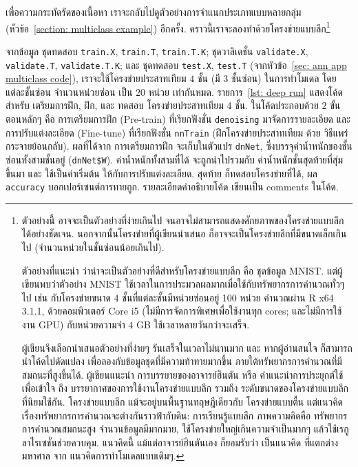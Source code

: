 เพื่อความกระทัดรัดของเนื้อหา เราจะกลับไปดูตัวอย่างการจำแนกประเภทแบบหลายกลุ่ม (หัวข้อ~\ref{section: multiclass example}) อีกครั้ง.
คราวนี้เราจะลองทำด้วยโครงข่ายแบบลึก\footnote{
ตัวอย่างนี้ อาจจะเป็นตัวอย่างที่ง่ายเกินไป จนอาจไม่สามารถแสดงศักยภาพของโครงข่ายแบบลึก
ได้อย่างชัดเจน.
นอกจากนั้นโครงข่ายที่ผู้เขียนนำเสนอ ก็อาจจะเป็นโครงข่ายลึกที่มีขนาดเล็กเกินไป (จำนวนหน่วยในชั้นซ่อนน้อยเกินไป).

ตัวอย่างที่แนะนำ ว่าน่าจะเป็นตัวอย่างที่ดีสำหรับโครงข่ายแบบลึก คือ ชุดข้อมูล MNIST\cite{MNIST20150311}.
แต่ผู้เขียนพบว่าตัวอย่าง MNIST ใช้เวลาในการประมวลผลมากเมื่อใช้กับทรัพยากรการคำนวณทั่วๆไป เช่น กับโครงข่ายขนาด 4 ชั้นที่แต่ละชั้นมีหน่วยซ่อนอยู่ 100 หน่วย คำนวณผ่าน R x64 3.1.1, ด้วยคอมพิวเตอร์ Core i5 (ไม่มีการจัดการพิเศษเพื่อใช้งานทุก cores; และไม่มีการใช้งาน GPU) กับหน่วยความจำ $4$ GB ใช้เวลาหลายวันกว่าจะเสร็จ.

ผู้เขียนจึงเลือกนำเสนอตัวอย่างที่ง่ายๆ รันเสร็จในเวลาไม่นานมาก และ หากผู้อ่านสนใจ ก็สามารถนำโค้ดไปดัดแปลง เพื่อลองกับข้อมูลชุดที่มีความท้าทายมากขึ้น ภายใต้ทรัพยากรการคำนวณที่มีสมถนะที่สูงขึ้นได้.
ผู้เขียนแนะนำ การบรรยายของอาจารย์ฮินตัน\cite{HintonBrainSexML} หรือ คำแนะนำการประยุกต์ใช้\cite{HintonRecipe} เพื่อเข้าใจ ถึง บรรยากาศของการใช้งานโครงข่ายแบบลึก รวมถึง ระดับขนาดของโครงข่ายแบบลึก ที่นิยมใช้กัน.
โครงข่ายแบบลึก แม้จะอยู่บนพื้นฐานทฤษฎีเดียวกับ โครงข่ายแบบตื้น แต่แนวคิดเรื่องทรัพยากรการคำนวณจะต่างกันราวฟ้ากับดิน:
การเรียนรู้แบบลึก ภาพความคิดคือ ทรัพยากรการคำนวณสมถนะสูง จำนวนข้อมูลมีมากมาย,
ใช้โครงข่ายใหญ่เกินความจำเป็นมากๆ แล้วใช้เรกูลาไรเซชั่นช่วยควบคุม.
แนวคิดนี้ แม้แต่อาจารย์ฮินตันเอง\cite{HintonBrainSexML} ก็ยอมรับว่า เป็นแนวคิด ที่แตกต่างมหาศาล จาก แนวคิดการทำโมเดลแบบเดิมๆ.
}

จากข้อมูล ชุดทดสอบ \verb|train.X|, \verb|train.T|, \verb|train.T.K|;
ชุดวาลิเดชั่น \verb|validate.X|, \verb|validate.T|, \verb|validate.T.K|;
และ ชุดทดสอบ \verb|test.X|, \verb|test.T| (จากหัวข้อ~\ref{sec: ann app multiclass code}), เราจะใช้โครงข่ายประสาทเทียม $4$ ชั้น (มี $3$ ชั้นซ่อน) ในการทำโมเดล โดย แต่ละชั้นซ่อน จำนวนหน่วยซ่อน เป็น $20$ หน่วย เท่ากันหมด.
รายการ~\ref{lst: deep run} แสดงโค้ดสำหรับ  เตรียมการฝึก, ฝึก, และ ทดสอบ โครงข่ายประสาทเทียม 4 ชั้น.
ในโค้ดประกอบด้วย $2$ ขั้นตอนหลักๆ คือ การเตรียมการฝึก (Pre-train) ที่เรียกฟังชั่น \verb|denoising| มาจัดการรายละเอียด
และ การปรับแต่งละเอียด (Fine-tune) ที่เรียกฟังชั่น \verb|nnTrain| (ฝึกโครงข่ายประสาทเทียม ด้วย วิธีแพร่กระจายย้อนกลับ).
ผลที่ได้จาก การเตรียมการฝึก จะเก็บในตัวแปร \verb|dnNet|, ซึ่งบรรจุค่าน้ำหนักของชั้นซ่อนทั้งสามชั้นอยู่ (\verb|dnNet$W|).
ค่าน้ำหนักทั้งสามที่ได้ จะถูกนำไปรวมกับ ค่าน้ำหนักชั้นสุดท้ายที่สุ่มขึ้นมา และ ใช้เป็นค่าเริ่มต้น ให้กับการปรับแต่งละเอียด.
สุดท้าย ก็ทดสอบโครงข่ายที่ได้, ผล \verb|accuracy| บอกเปอร์เซนต์การทายถูก.
รายละเอียดคำอธิบายโค้ด เขียนเป็น comments ในโค้ด.


